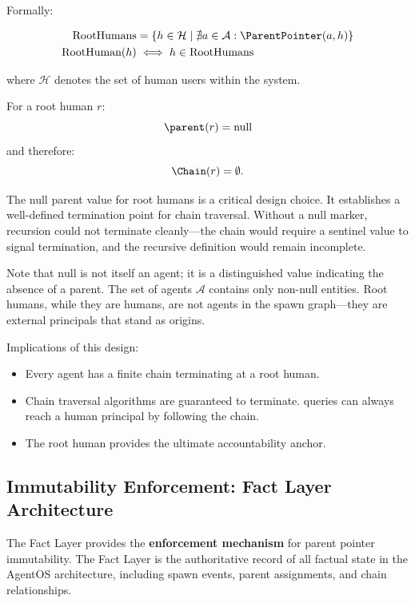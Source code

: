 Formally:

\begin{align*}
\text{RootHumans} &= \{ h \in \mathcal{H} \mid \nexists a \in \mathcal{A} : \ParentPointer(a, h) \} \\
\text{RootHuman}(h) &\iff h \in \text{RootHumans}
\end{align*}

where $\mathcal{H}$ denotes the set of human users within the system.

For a root human $r$:
\begin{equation}
\parent(r) = \text{null}
\end{equation}
and therefore:
\begin{equation}
\Chain(r) = \emptyset.
\end{equation}

The null parent value for root humans is a critical design choice. It establishes a well-defined termination point for chain traversal. Without a null marker, recursion could not terminate cleanly—the chain would require a sentinel value to signal termination, and the recursive definition would remain incomplete.

Note that $\text{null}$ is not itself an agent; it is a distinguished value indicating the absence of a parent. The set of agents $\mathcal{A}$ contains only non-null entities. Root humans, while they are humans, are not agents in the spawn graph—they are external principals that stand as origins.

Implications of this design:

\begin{itemize}
    \item Every agent has a finite chain terminating at a root human.
    \item Chain traversal algorithms are guaranteed to terminate.
     queries can always reach a human principal by following the chain.
    \item The root human provides the ultimate accountability anchor.
\end{itemize}

\subsection{Immutability Enforcement: Fact Layer Architecture}

The Fact Layer provides the \textbf{enforcement mechanism} for parent pointer immutability. The Fact Layer is the authoritative record of all factual state in the AgentOS architecture, including spawn events, parent assignments, and chain relationships.

